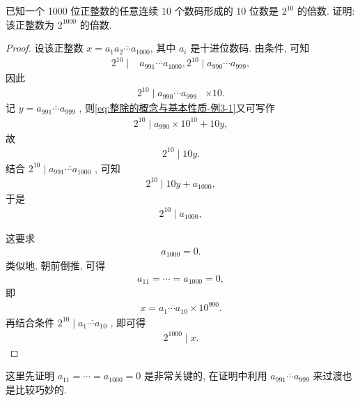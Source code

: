 \begin{example}
	已知一个 1000 位正整数的任意连续 10 个数码形成的 10 位数是 $2^{10}$ 的倍数. 证明: 该正整数为 $2^{1000}$ 的倍数.
\end{example}
\begin{proof}
	设该正整数 $x=\overline{a_{1} a_{2} \cdots a_{1000}}$, 其中 $a_{i}$ 是十进位数码. 由条件, 可知
	\begin{align}
		2^{10} \mid & \overline{a_{991} \cdots a_{1000}}, 2^{10} \mid \overline{a_{990} \cdots a_{999}},
	\end{align}
	因此
	\begin{align}\label{eq:整除的概念与基本性质-例3-1}
		2^{10} \mid \overline{a_{990} \cdots a_{999}} & \times 10.
	\end{align}
	记 $y=\overline{a_{991} \cdots a_{999}}$ , 则\autoref{eq:整除的概念与基本性质-例3-1}又可写作
	\begin{align*}
		2^{10} \mid a_{990} \times 10^{10}+10 y,
	\end{align*}
	故
	\begin{align*}
		2^{10} \mid 10 y.
	\end{align*}
	结合 $2^{10} \mid \overline{a_{991} \cdots a_{1000}}$ , 可知
	\begin{align*}
		2^{10} \mid 10 y+a_{1000},
	\end{align*}
	于是
	\begin{align*}
		2^{10} \mid a_{1000},
	\end{align*}

	这要求
	\begin{align*}
		a_{1000}=0.
	\end{align*}
	类似地, 朝前倒推, 可得
	\begin{align*}
		a_{11}=\cdots=a_{1000}=0,
	\end{align*}
	即
	\begin{align*}
		x=\overline{a_{1} \cdots a_{10}} \times 10^{990}.
	\end{align*}
	再结合条件 $2^{10} \mid \overline{a_{1} \cdots a_{10}}$ , 即可得
	\begin{align*}
		2^{1000} \mid x.
	\end{align*}
\end{proof}
\begin{note}
	这里先证明 $a_{11}=\cdots=a_{1000}=0$ 是非常关键的, 在证明中利用 $\overline{a_{991} \cdots a_{999}}$ 来过渡也是比较巧妙的.
\end{note}


